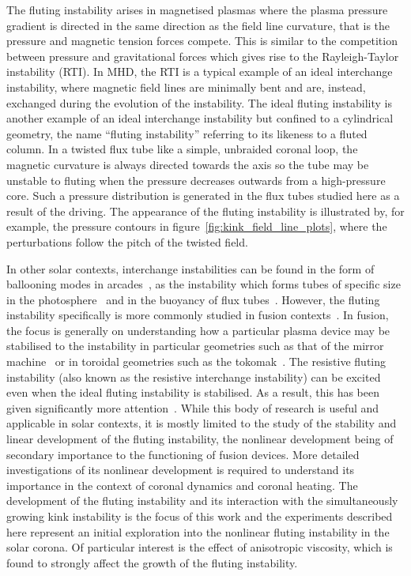 \documentclass[12pt]{article}
\begin{document}
The fluting instability arises in magnetised plasmas where the plasma pressure gradient is directed in the same direction as the field line curvature, that is the pressure and magnetic tension forces compete. This is similar to the competition between pressure and gravitational forces which gives rise to the Rayleigh-Taylor instability (RTI). In MHD, the RTI is a typical example of an ideal interchange instability, where magnetic field lines are minimally bent and are, instead, exchanged during the evolution of the instability. The ideal fluting instability is another example of an ideal interchange instability but confined to a cylindrical geometry, the name ``fluting instability'' referring to its likeness to a fluted column. In a twisted flux tube like a simple, unbraided coronal loop, the magnetic curvature is always directed towards the axis so the tube may be unstable to fluting when the pressure decreases outwards from a high-pressure core. Such a pressure distribution is generated in the flux tubes studied here as a result of the driving. The appearance of the fluting instability is illustrated by, for example, the pressure contours in figure~\ref{fig:kink_field_line_plots}, where the perturbations follow the pitch of the twisted field.

In other solar contexts, interchange instabilities can be found in the form of ballooning modes in arcades~\cite{hoodBallooningInstabilitiesSolar1986}, as the instability which forms tubes of specific size in the photosphere~\cite{bunteInterchangeInstabilitySolar1993} and in the buoyancy of flux tubes~\cite{schuesslerInterchangeInstabilitySmall1984}. However, the fluting instability specifically is more commonly studied in fusion contexts~\cite{mikhailovskiiInstabilitiesConfinedPlasma1998,zhengAdvancedTokamakStability2015,wessonHydromagneticStabilityTokamaks1978}. In fusion, the focus is generally on understanding how a particular plasma device may be stabilised to the instability in particular geometries such as that of the mirror machine~\cite{jungwirthTheoryFluteInstability1965} or in toroidal geometries such as the tokomak~\cite{shafranovFluteInstabilityCurrentcarrying1968}. The resistive fluting instability (also known as the resistive interchange instability) can be excited even when the ideal fluting instability is stabilised. As a result, this has been given significantly more attention~\cite{johnsonResistiveInterchangesNegativeV1967,correa-restrepoResistiveBallooningModes1983}. While this body of research is useful and applicable in solar contexts, it is mostly limited to the study of the stability and linear development of the fluting instability, the nonlinear development being of secondary importance to the functioning of fusion devices. More detailed investigations of its nonlinear development is required to understand its importance in the context of coronal dynamics and coronal heating. The development of the fluting instability and its interaction with the simultaneously growing kink instability is the focus of this work and the experiments described here represent an initial exploration into the nonlinear fluting instability in the solar corona. Of particular interest is the effect of anisotropic viscosity, which is found to strongly affect the growth of the fluting instability.
\end{document}
